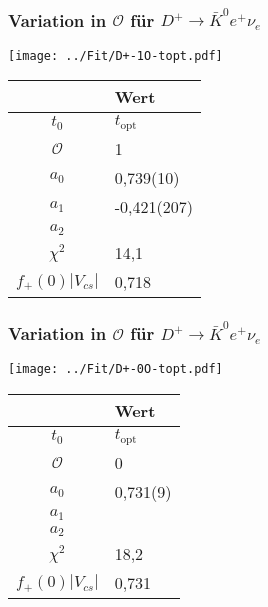 \documentclass[hyperref={pdfpagelabels=false}]{beamer}
\begin{document}
\begin{frame}
 \frametitle{Variation in $\mathcal{O}$ für $D^+\rightarrow \bar K^0 e^+ \nu_e$}
  \begin{minipage}[h]{0.66\textwidth}
  \texttt{[image: ../Fit/D+-1O-topt.pdf]}
 \end{minipage}
 \begin{minipage}[h]{0.32\textwidth}
  \begin{table}[h]
   \begin{tabular}{c|l}
   \toprule
     & Wert\\
    \midrule
    $t_0$ & $t_\text{opt}$\\
    $\mathcal{O}$ & 1\\
    \midrule
    $a_0$ & 0,739(10)\\
    $a_1$ & -0,421(207)\\
    $a_2$ & \\
    \midrule
    $\chi^2$ & 14,1\\
    $f_+(0)|V_{cs}|$ & 0,718\\
    \bottomrule\bottomrule
   \end{tabular}

  \end{table}

 \end{minipage}
\end{frame}

\begin{frame}
 \frametitle{Variation in $\mathcal{O}$ für $D^+\rightarrow \bar K^0 e^+ \nu_e$}
  \begin{minipage}[h]{0.66\textwidth}
  \texttt{[image: ../Fit/D+-0O-topt.pdf]}
 \end{minipage}
 \begin{minipage}[h]{0.32\textwidth}
  \begin{table}[h]
   \begin{tabular}{c|l}
   \toprule
     & Wert\\
    \midrule
    $t_0$ & $t_\text{opt}$\\
    $\mathcal{O}$ & 0\\
    \midrule
    $a_0$ & 0,731(9)\\
    $a_1$ & \\
    $a_2$ & \\
    \midrule
    $\chi^2$ & 18,2\\
    $f_+(0)|V_{cs}|$ & 0,731\\
    \bottomrule\bottomrule
   \end{tabular}

  \end{table}

 \end{minipage}
\end{frame}
\end{document}
